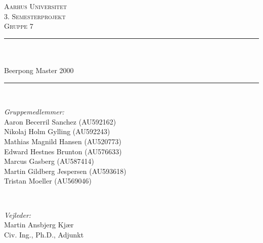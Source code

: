 \begin{titlepage}

\newcommand{\HRule}{\rule{\linewidth}{0.5mm}} %

\center %
 

\textsc{\LARGE Aarhus Universitet }\\[0.3cm] %
\textsc{\Large 3. Semesterprojekt }\\[0.3cm]
\textsc{\Large Gruppe 7 }\\[0.5cm] %


\HRule \\[0.4cm]
{ \huge \bfseries \titlename}\\[0.03cm]{Beerpong Master 2000} %
\HRule \\[1.5cm]

 

\begin{minipage}{0.4\textwidth}
\begin{flushleft} \small
\emph{Gruppemedlemmer:}
\\Aaron Becerril Sanchez (AU592162)
\\Nikolaj Holm Gylling (AU592243)
\\Mathias Magnild Hansen (AU520773)
\\Edward Hestnes Brunton (AU576633)
\\Marcus Gasberg (AU587414) 
\\Martin Gildberg Jespersen (AU593618) 
\\Tristan Moeller (AU569046)
\end{flushleft}
\end{minipage}
~
\begin{minipage}{0.4\textwidth}
\begin{flushright} \small
\emph{Vejleder:} \\
Martin Ansbjerg Kjær \\ Civ. Ing., Ph.D., Adjunkt %
\end{flushright}
\end{minipage}\\[1cm]


\end{titlepage}
